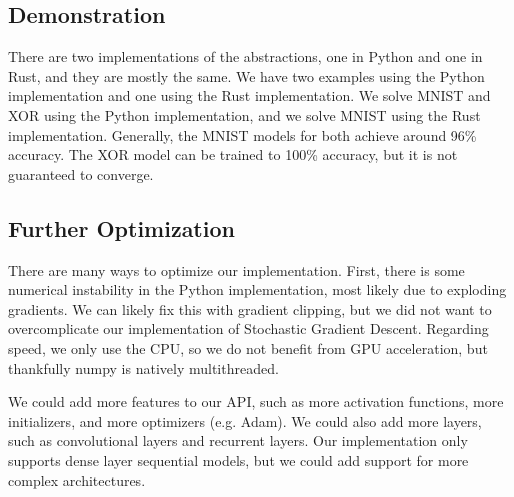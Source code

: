 \documentclass[12pt]{article}
\begin{document}
\subsection*{Demonstration}

There are two implementations of the abstractions, one in Python and one in Rust, and they are mostly the same.
We have two examples using the Python implementation and one using the Rust implementation.
We solve MNIST and XOR using the Python implementation, and we solve MNIST using the Rust implementation.
Generally, the MNIST models for both achieve around 96\% accuracy.
The XOR model can be trained to 100\% accuracy, but it is not guaranteed to converge.

\subsection*{Further Optimization}

There are many ways to optimize our implementation.
First, there is some numerical instability in the Python implementation, most likely due to exploding gradients.
We can likely fix this with gradient clipping, but we did not want to overcomplicate our implementation of Stochastic Gradient Descent.
Regarding speed, we only use the CPU, so we do not benefit from GPU acceleration, but thankfully numpy is natively multithreaded.

We could add more features to our API, such as more activation functions, more initializers, and more optimizers (e.g. Adam).
We could also add more layers, such as convolutional layers and recurrent layers.
Our implementation only supports dense layer sequential models, but we could add support for more complex architectures.
\end{document}
